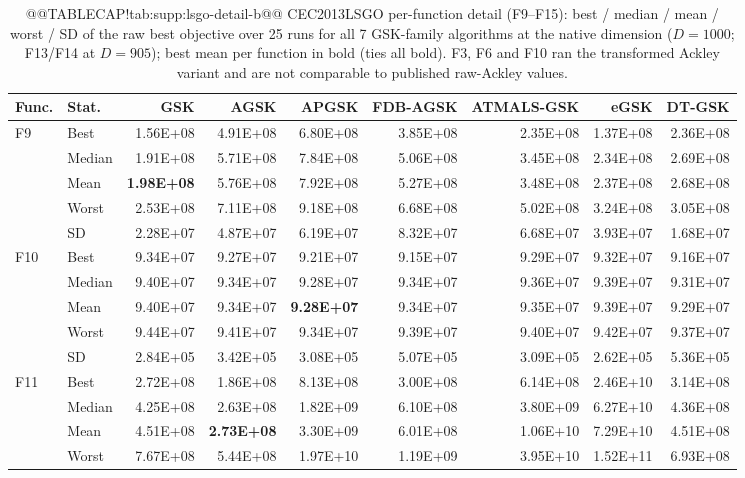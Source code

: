 \documentclass[10pt,a4paper]{article}
\newcommand{\bestval}[1]{\textbf{#1}}
\begin{document}
\begin{table}[p]
\caption{@@TABLECAP!tab:supp:lsgo-detail-b@@ CEC2013LSGO per-function detail (F9--F15): best / median / mean /
worst / SD of the raw best objective over 25 runs for all 7 GSK-family
algorithms at the native dimension ($D = 1000$; F13/F14 at $D = 905$);
best mean per function in bold (ties all bold).  F3, F6 and F10 ran the
transformed Ackley variant and are not comparable to published
raw-Ackley values.
}\label{tab:supp:lsgo-detail-b}


\zebra
\begin{tabular}{llrrrrrrr}
\toprule
\textbf{Func.} & \textbf{Stat.} & \textbf{GSK} & \textbf{AGSK} & \textbf{APGSK} & \textbf{FDB-AGSK} & \textbf{ATMALS-GSK} & \textbf{eGSK} & \textbf{DT-GSK} \\
\midrule
F9 & Best & 1.56E+08 & 4.91E+08 & 6.80E+08 & 3.85E+08 & 2.35E+08 & 1.37E+08 & 2.36E+08 \\
 & Median & 1.91E+08 & 5.71E+08 & 7.84E+08 & 5.06E+08 & 3.45E+08 & 2.34E+08 & 2.69E+08 \\
 & Mean & \bestval{1.98E+08} & 5.76E+08 & 7.92E+08 & 5.27E+08 & 3.48E+08 & 2.37E+08 & 2.68E+08 \\
 & Worst & 2.53E+08 & 7.11E+08 & 9.18E+08 & 6.68E+08 & 5.02E+08 & 3.24E+08 & 3.05E+08 \\
 & SD & 2.28E+07 & 4.87E+07 & 6.19E+07 & 8.32E+07 & 6.68E+07 & 3.93E+07 & 1.68E+07 \\
\midrule
F10 & Best & 9.34E+07 & 9.27E+07 & 9.21E+07 & 9.15E+07 & 9.29E+07 & 9.32E+07 & 9.16E+07 \\
 & Median & 9.40E+07 & 9.34E+07 & 9.28E+07 & 9.34E+07 & 9.36E+07 & 9.39E+07 & 9.31E+07 \\
 & Mean & 9.40E+07 & 9.34E+07 & \bestval{9.28E+07} & 9.34E+07 & 9.35E+07 & 9.39E+07 & 9.29E+07 \\
 & Worst & 9.44E+07 & 9.41E+07 & 9.34E+07 & 9.39E+07 & 9.40E+07 & 9.42E+07 & 9.37E+07 \\
 & SD & 2.84E+05 & 3.42E+05 & 3.08E+05 & 5.07E+05 & 3.09E+05 & 2.62E+05 & 5.36E+05 \\
\midrule
F11 & Best & 2.72E+08 & 1.86E+08 & 8.13E+08 & 3.00E+08 & 6.14E+08 & 2.46E+10 & 3.14E+08 \\
 & Median & 4.25E+08 & 2.63E+08 & 1.82E+09 & 6.10E+08 & 3.80E+09 & 6.27E+10 & 4.36E+08 \\
 & Mean & 4.51E+08 & \bestval{2.73E+08} & 3.30E+09 & 6.01E+08 & 1.06E+10 & 7.29E+10 & 4.51E+08 \\
 & Worst & 7.67E+08 & 5.44E+08 & 1.97E+10 & 1.19E+09 & 3.95E+10 & 1.52E+11 & 6.93E+08 \\

\end{tabular}
\end{table}
\end{document}
